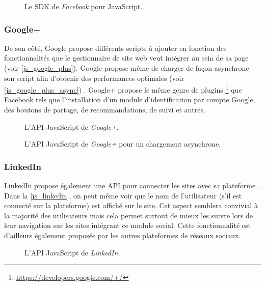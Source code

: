 \begin{figure}[h]
	\centering
	
	\caption{\label{js_facebook_sdk}Le SDK de \textit{Facebook} pour JavaScript.}
\end{figure}

\subsubsection{Google+}
De son côté, Google propose différents scripts à ajouter en fonction des fonctionnalités que le gestionnaire de site web veut intégrer au sein de sa page (voir \autoref{js_google_plus}). Google propose même de charger de façon asynchrone son script afin d'obtenir des performances optimales (voir \autoref{js_google_plus_async}) \cite{javascript_google_plus}. Google+ propose le même genre de plugins \footnote{\url{https://developers.google.com/+/}} que Facebook tels que l'installation d'un module d'identification par compte Google, des boutons de partage, de recommandations, de suivi et autres.

\begin{figure}[h]
	\centering
	
	\caption{\label{js_google_plus}L'API JavaScript de \textit{Google+}.}
\end{figure}

\begin{figure}[h]
	\centering
	
	\caption{\label{js_google_plus_async}L'API JavaScript de \textit{Google+} pour un chargement asynchrone.}
\end{figure}

\subsubsection{LinkedIn}
LinkedIn propose également une API pour connecter les sites avec sa plateforme \cite{javascript_linkedin}. Dans la \autoref{js_linkedin}, on peut même voir que le nom de l'utilisateur (s'il est connecté sur la plateforme) est affiché sur le site. Cet aspect semblera convivial à la majorité des utilisateurs mais cela permet surtout de mieux les suivre lors de leur navigation sur les sites intégrant ce module social. Cette fonctionnalité est d'ailleurs également proposée par les autres plateformes de réseaux sociaux.

\begin{figure}[!h]
	\centering
	
	\caption{\label{js_linkedin}L'API JavaScript de \textit{LinkedIn}.}
\end{figure}

